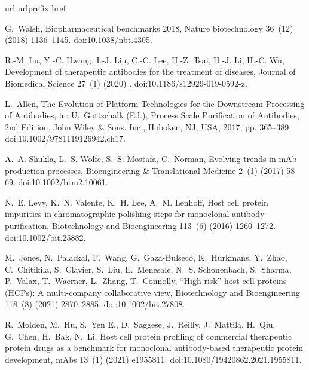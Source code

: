\documentclass[preprint,review,12pt]{elsarticle}
\providecommand{\DIFaddtex}[1]{{\protect\color{blue}\uwave{#1}}} %
\providecommand{\DIFaddbegin}{} %
\providecommand{\DIFaddend}{} %
\providecommand{\DIFadd}[1]{\texorpdfstring{\DIFaddtex{#1}}{#1}} %
\begin{document}

\begin{thebibliography}{10}
\expandafter\ifx\csname url\endcsname\relax
  \def\url#1{\texttt{#1}}\fi
\expandafter\ifx\csname urlprefix\endcsname\relax\def\urlprefix{URL }\fi
\expandafter\ifx\csname href\endcsname\relax
  \def\href#1#2{#2} \def\path#1{#1}\fi

G.~Walsh, {Biopharmaceutical benchmarks 2018}, Nature biotechnology 36~(12)
  (2018) 1136--1145.
\newblock \href {https://doi.org/10.1038/nbt.4305}
  {\path{doi:10.1038/nbt.4305}}.

R.-M. Lu, Y.-C. Hwang, I.-J. Liu, C.-C. Lee, H.-Z. Tsai, H.-J. Li, H.-C. Wu,
  {Development of therapeutic antibodies for the treatment of diseases},
  Journal of Biomedical Science 27~(1) (2020) \DIFaddbegin \DIFadd{1--30}\DIFaddend .
\newblock \href {https://doi.org/10.1186/s12929-019-0592-z}
  {\path{doi:10.1186/s12929-019-0592-z}}.

L.~Allen, {The Evolution of Platform Technologies for the Downstream Processing
  of Antibodies}, in: U.~Gottschalk (Ed.), Process Scale Purification of
  Antibodies, 2nd Edition, John Wiley \& Sons, Inc., Hoboken, NJ, USA, 2017,
  pp. 365--389.
\newblock \href {https://doi.org/10.1002/9781119126942.ch17}
  {\path{doi:10.1002/9781119126942.ch17}}.

A.~A. Shukla, L.~S. Wolfe, S.~S. Mostafa, C.~Norman, {Evolving trends in mAb
  production processes}, Bioengineering \& Translational Medicine 2~(1) (2017)
  58--69.
\newblock \href {https://doi.org/10.1002/btm2.10061}
  {\path{doi:10.1002/btm2.10061}}.

N.~E. Levy, K.~N. Valente, K.~H. Lee, A.~M. Lenhoff, {Host cell protein
  impurities in chromatographic polishing steps for monoclonal antibody
  purification}, Biotechnology and Bioengineering 113~(6) (2016) 1260--1272.
\newblock \href {https://doi.org/10.1002/bit.25882}
  {\path{doi:10.1002/bit.25882}}.

M.~Jones, N.~Palackal, F.~Wang, G.~Gaza-Bulseco, K.~Hurkmans, Y.~Zhao,
  C.~Chitikila, S.~Clavier, S.~Liu, E.~Menesale, N.~S. Schonenbach, S.~Sharma,
  P.~Valax, T.~Waerner, L.~Zhang, T.~Connolly, {“High-risk” host cell
  proteins (HCPs): A multi-company collaborative view}, Biotechnology and
  Bioengineering 118~(8) (2021) 2870--2885.
\newblock \href {https://doi.org/10.1002/bit.27808}
  {\path{doi:10.1002/bit.27808}}.

R.~Molden, M.~Hu, S.~{Yen E.}, D.~Saggese, J.~Reilly, J.~Mattila, H.~Qiu,
  G.~Chen, H.~Bak, N.~Li, {Host cell protein profiling of commercial
  therapeutic protein drugs as a benchmark for monoclonal antibody-based
  therapeutic protein development}, mAbs 13~(1) (2021) e1955811.
\newblock \href {https://doi.org/10.1080/19420862.2021.1955811}
  {\path{doi:10.1080/19420862.2021.1955811}}.


\end{thebibliography}
\end{document}
